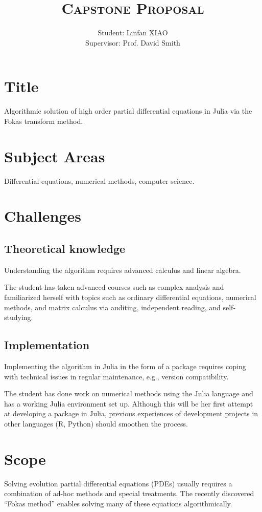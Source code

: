\documentclass[11pt, oneside, a4paper]{article}
\author{
    Student: Linfan XIAO\\
    Supervisor: Prof. David Smith
    }
\title{\textsc{Capstone Proposal}}
\date{\vspace{-5ex}}
\begin{document}
\maketitle

\thispagestyle{fancy}


\section{Title}
Algorithmic solution of high order partial differential equations in Julia via the Fokas transform method.

\section{Subject Areas}
Differential equations, numerical methods, computer science.

\section{Challenges}
\subsection{Theoretical knowledge}
Understanding the algorithm requires advanced calculus and linear algebra. 

The student has taken advanced courses such as complex analysis and familiarized herself with topics such as ordinary differential equations, numerical methods, and matrix calculus via auditing, independent reading, and self-studying.

\subsection{Implementation}
Implementing the algorithm in Julia in the form of a package requires coping with technical issues in regular maintenance, e.g., version compatibility. 

The student has done work on numerical methods using the Julia language and has a working Julia environment set up. Although this will be her first attempt at developing a package in Julia, previous experiences of development projects in other languages (R, Python) should smoothen the process.

\section{Scope}
Solving evolution partial differential equations (PDEs) usually requires a combination of ad-hoc methods and special treatments. The recently discovered ``Fokas method'' enables solving many of these equations algorithmically. 
\end{document}
